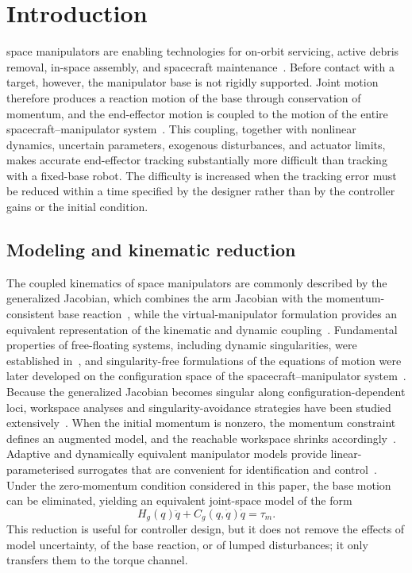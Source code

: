 \section{Introduction}
 space manipulators are enabling technologies for on-orbit servicing, active debris removal, in-space assembly, and spacecraft maintenance~\cite{liu2021review,yoshida2003etsvii}. Before contact with a target, however, the manipulator base is not rigidly supported. Joint motion therefore produces a reaction motion of the base through conservation of momentum, and the end-effector motion is coupled to the motion of the entire spacecraft--manipulator system~\cite{dubowsky1993,papadopoulos1991nature}. This coupling, together with nonlinear dynamics, uncertain parameters, exogenous disturbances, and actuator limits, makes accurate end-effector tracking substantially more difficult than tracking with a fixed-base robot. The difficulty is increased when the tracking error must be reduced within a time specified by the designer rather than by the controller gains or the initial condition.

\subsection{Modeling and kinematic reduction}
The coupled kinematics of space manipulators are commonly described by the generalized Jacobian, which combines the arm Jacobian with the momentum-consistent base reaction~\cite{umetani1989}, while the virtual-manipulator formulation provides an equivalent representation of the kinematic and dynamic coupling~\cite{vafa1990}. Fundamental properties of free-floating systems, including dynamic singularities, were established in~\cite{papadopoulos1993}, and singularity-free formulations of the equations of motion were later developed on the configuration space of the spacecraft--manipulator system~\cite{from2011singularity}. Because the generalized Jacobian becomes singular along configuration-dependent loci, workspace analyses and singularity-avoidance strategies have been studied extensively~\cite{nanos2015avoiding,nanos2023fullpose}. When the initial momentum is nonzero, the momentum constraint defines an augmented model, and the reachable workspace shrinks accordingly~\cite{nanos2017momentum,nanos2023fullpose}. Adaptive and dynamically equivalent manipulator models provide linear-parameterised surrogates that are convenient for identification and control~\cite{parlaktuna2004,yan}. Under the zero-momentum condition considered in this paper, the base motion can be eliminated, yielding an equivalent joint-space model of the form
\begin{equation}
 H_g(q)\ddot q+C_g(q,\dot q)\dot q=\tau_m .
\label{eq:intro_reduced_dynamics}
\end{equation}
This reduction is useful for controller design, but it does not remove the effects of model uncertainty, of the base reaction, or of lumped disturbances; it only transfers them to the torque channel.

